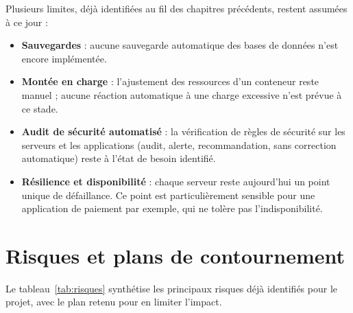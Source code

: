 Plusieurs limites, déjà identifiées au fil des chapitres précédents,
restent assumées à ce jour :

\begin{itemize}
  \item \textbf{Sauvegardes} : aucune sauvegarde automatique des bases
        de données n'est encore implémentée.
  \item \textbf{Montée en charge} : l'ajustement des ressources d'un
        conteneur reste manuel ; aucune réaction automatique à une
        charge excessive n'est prévue à ce stade.
  \item \textbf{Audit de sécurité automatisé} : la vérification de
        règles de sécurité sur les serveurs et les applications (audit,
        alerte, recommandation, sans correction automatique) reste à
        l'état de besoin identifié.
  \item \textbf{Résilience et disponibilité} : chaque serveur reste
        aujourd'hui un point unique de défaillance. Ce point est
        particulièrement sensible pour une application de paiement par exemple, qui ne tolère pas l'indisponibilité.
\end{itemize}

\section{Risques et plans de contournement}

Le tableau~\ref{tab:risques} synthétise les principaux risques déjà
identifiés pour le projet, avec le plan retenu pour en limiter l'impact.

